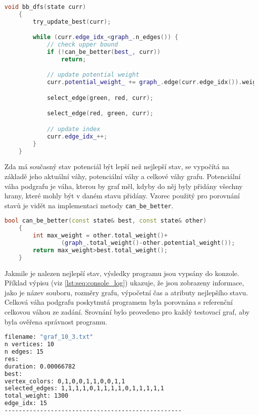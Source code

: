 \begin{lstlisting}[language=C++, label={lst:bb_dfs}, title={Metoda pro prohledávání stavového prostoru}]
    void bb_dfs(state curr)
    {
        try_update_best(curr);

        while (curr.edge_idx_<graph_.n_edges()) {
            // check upper bound
            if (!can_be_better(best_, curr))
                return;

            // update potential weight
            curr.potential_weight_ += graph_.edge(curr.edge_idx()).weight;

            select_edge(green, red, curr);

            select_edge(red, green, curr);

            // update index
            curr.edge_idx_++;
        }
    }
\end{lstlisting}

Zda má současný stav potenciál být lepší než nejlepší stav, se vypočítá na základě jeho aktuální váhy, potenciální váhy a celkové váhy grafu.
Potenciální váha podgrafu je váha, kterou by graf měl, kdyby do něj byly přidány všechny hrany, které mohly být v daném stavu přidány.
Vzorec použitý pro porovnání stavů je vidět na implementaci metody \texttt{can\_be\_better}.

\begin{lstlisting}[language=C++, label={lst:can_be_better}, title={Metoda pro ořezávání shora}]
    bool can_be_better(const state& best, const state& other)
    {
        int max_weight = other.total_weight()+
                (graph_.total_weight()-other.potential_weight());
        return max_weight>best.total_weight();
    }
\end{lstlisting}

Jakmile je nalezen nejlepší stav, výsledky programu jsou vypsány do konzole.
Příklad výpisu (viz \ref{lst:seq:console_log}) ukazuje, že jsou zobrazeny informace, jako je název souboru, rozměry grafu, výpočetní čas a atributy nejlepšího stavu.
Celková váha podgrafu poskytnutá programem byla porovnána s referenční celkovou váhou ze zadání.
Srovnání bylo provedeno pro každý testovací graf, aby byla ověřena správnost programu.

\begin{lstlisting}[language=bash, label={lst:seq:console_log}, title={Příklad výpisu výsledků}]
filename: "graf_10_3.txt"
n vertices: 10
n edges: 15
res:
duration: 0.00066782
best:
vertex_colors: 0,1,0,0,1,1,0,0,1,1
selected_edges: 1,1,1,1,0,1,1,1,1,0,1,1,1,1,1
total_weight: 1300
edge_idx: 15
--------------------------------------------------
\end{lstlisting}






